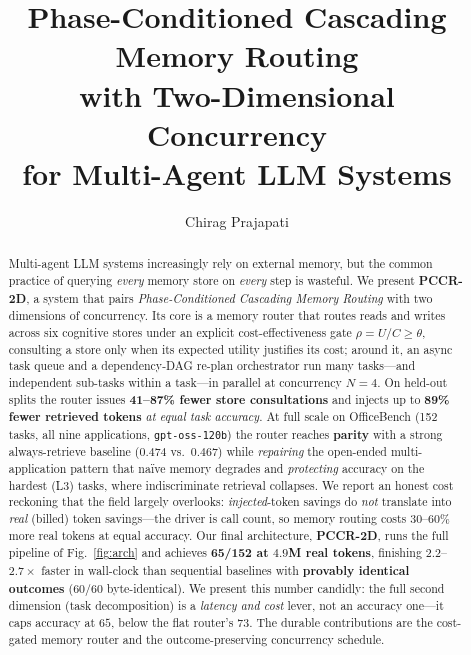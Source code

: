 \documentclass[10pt,twocolumn]{article}
\title{\textbf{Phase-Conditioned Cascading Memory Routing\\
with Two-Dimensional Concurrency\\
for Multi-Agent LLM Systems}}
\author[1]{Chirag Prajapati}
\date{}
\newcommand{\code}[1]{\texttt{\small #1}}
\begin{document}
\maketitle

\begin{abstract}
Multi-agent LLM systems increasingly rely on external memory, but the common practice of querying
\emph{every} memory store on \emph{every} step is wasteful. We present \textbf{PCCR-2D}, a system that
pairs \emph{Phase-Conditioned Cascading Memory Routing} with two dimensions of concurrency. Its core is
a memory router that routes reads and writes across six cognitive stores under an explicit
cost-effectiveness gate $\rho=U/C\!\ge\!\theta$, consulting a store only when its expected utility
justifies its cost; around it, an async task queue and a dependency-DAG re-plan orchestrator run many
tasks---and independent sub-tasks within a task---in parallel at concurrency $N{=}4$.
On held-out splits the router issues \textbf{41--87\% fewer store consultations} and injects up to
\textbf{89\% fewer retrieved tokens} \emph{at equal task accuracy}. At full scale on OfficeBench
(152 tasks, all nine applications, \code{gpt-oss-120b}) the router reaches \textbf{parity} with a
strong always-retrieve baseline ($0.474$ vs.\ $0.467$) while \emph{repairing} the open-ended
multi-application pattern that na\"ive memory degrades and \emph{protecting} accuracy on the hardest
(L3) tasks, where indiscriminate retrieval collapses. We report an honest cost reckoning that the field
largely overlooks: \emph{injected}-token savings do \emph{not} translate into \emph{real} (billed)
token savings---the driver is call count, so memory routing costs $30$--$60\%$ more real tokens at
equal accuracy. Our final architecture, \textbf{PCCR-2D}, runs the full pipeline of
Fig.~\ref{fig:arch} and achieves \textbf{65/152 at $4.9$M real tokens}, finishing $2.2$--$2.7\times$
faster in wall-clock than sequential baselines with \textbf{provably identical outcomes}
($60/60$ byte-identical). We present this number candidly: the full second dimension (task
decomposition) is a \emph{latency and cost} lever, not an accuracy one---it caps accuracy at $65$,
below the flat router's $73$. The durable contributions are the cost-gated memory router and the
outcome-preserving concurrency schedule.
\end{abstract}

\end{document}
